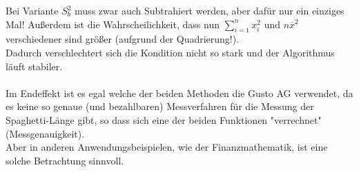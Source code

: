 \documentclass{llncs}
\begin{document}
Bei Variante $S^2_b$ muss zwar auch Subtrahiert werden, aber dafür nur ein einziges Mal! Außerdem ist die Wahrscheilichkeit, dass nun $\sum_{i=1}^n x_i^2$ und $n\overline{x}^2$ verschiedener sind größer (aufgrund der Quadrierung!).\\
Dadurch verschlechtert sich die Kondition nicht so stark und der Algorithmus läuft stabiler.\\
\\
Im Endeffekt ist es egal welche der beiden Methoden die Gusto AG verwendet, da es keine so genaue (und bezahlbaren) Messverfahren für die Messung der Spaghetti-Länge gibt, so dass sich eine der beiden Funktionen "verrechnet" (Messgenauigkeit).\\
Aber in anderen Anwendungsbeispielen, wie der Finanzmathematik, ist eine solche Betrachtung sinnvoll.
\end{document}
